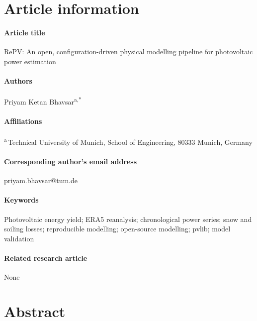\documentclass[11pt]{article}
\begin{document}
\section*{Article information}

\paragraph{Article title}
RePV: An open, configuration-driven physical modelling pipeline for photovoltaic power estimation

\paragraph{Authors}
Priyam Ketan Bhavsar\textsuperscript{a,*}

\paragraph{Affiliations}
\textsuperscript{a}\,Technical University of Munich, School of Engineering, 80333 Munich, Germany

\paragraph{Corresponding author's email address}
priyam.bhavsar@tum.de

\paragraph{Keywords}
Photovoltaic energy yield; ERA5 reanalysis; chronological power series; snow and soiling losses; reproducible modelling; open-source modelling; pvlib; model validation

\paragraph{Related research article}
None

\section*{Abstract}
\end{document}
